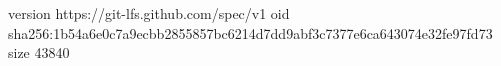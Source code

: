 version https://git-lfs.github.com/spec/v1
oid sha256:1b54a6e0c7a9ecbb2855857bc6214d7dd9abf3c7377e6ca643074e32fe97fd73
size 43840
